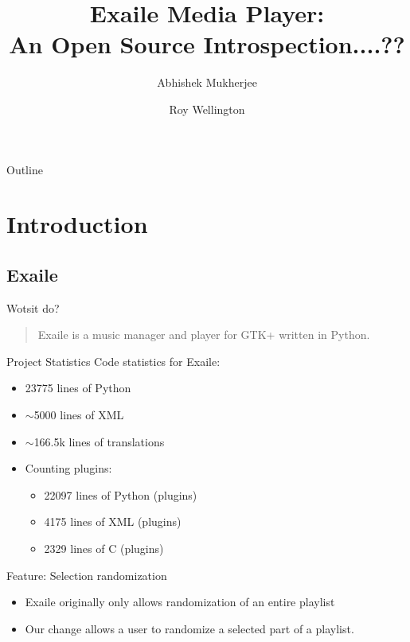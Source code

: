 \documentclass{beamer}
\title
{%
  Exaile Media Player:\\
  An Open Source Introspection....?? %
}
\author
{
  Abhishek Mukherjee \and
  Roy Wellington
}
\begin{document}
\begin{frame}
  \titlepage
\end{frame}

\begin{frame}{Outline}
  \tableofcontents
\end{frame}


\section{Introduction}

\subsection{Exaile}

\begin{frame}{Wotsit do?}
  \begin{quote}
    Exaile is a music manager and player for GTK+ written in Python.
  \end{quote}
\end{frame}

\begin{frame}{Project Statistics}
  Code statistics for Exaile:
  \begin{itemize}
    \item 23775 lines of Python
    \item $\sim$5000 lines of XML
    \item $\sim$166.5k lines of translations
	\item Counting plugins:
	\begin{itemize}
      \item 22097 lines of Python (plugins)
      \item 4175 lines of XML (plugins)
      \item 2329 lines of C (plugins)
	\end{itemize}
  \end{itemize}
\end{frame}

\begin{frame}{Feature: Selection randomization}
  \begin{itemize}
     \item Exaile originally only allows randomization of an entire playlist
     \item Our change allows a user to randomize a selected part of a playlist.
  \end{itemize}
\end{frame}
\end{document}
